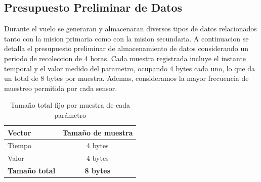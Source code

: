   \subsection{Presupuesto Preliminar de Datos}
    Durante el vuelo se generaran y almacenaran diversos tipos de datos relacionados tanto
    con la mision primaria como con la mision secundaria. A continuacion se detalla el presupuesto preliminar de almacenamiento de datos considerando un periodo de recoleccion de 4
    horas.
    Cada muestra registrada incluye el instante temporal y el valor medido del parametro, ocupando 4 bytes cada uno, lo que da un total de 8 bytes por muestra. Ademas, consideramos
    la mayor frecuencia de muestreo permitida por cada sensor.

    \begin{table}[H]
    \centering
    \begin{tabular}{|l|c|}
    \hline
    \textbf{Vector} & \textbf{Tamaño de muestra} \\
    \hline
    Tiempo & 4 bytes \\
    Valor  & 4 bytes \\
    \hline
    \textbf{Tamaño total} & \textbf{8 bytes} \\
    \hline
    \end{tabular}
    \caption{Tamaño total fijo por muestra de cada parámetro}
    \label{tab:tamanio_muestra}
    \end{table}

